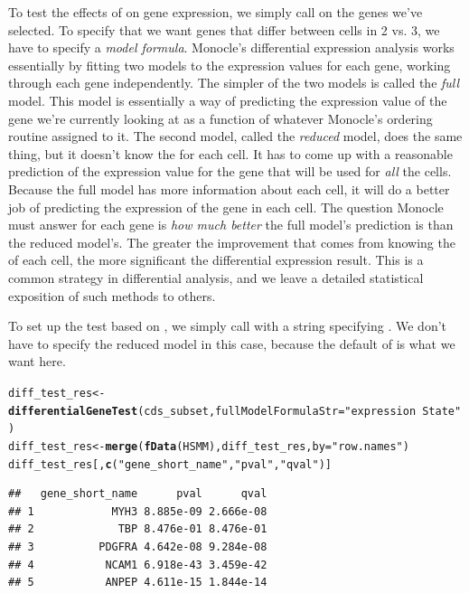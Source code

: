 \documentclass[10pt,oneside]{article}\usepackage[]{graphicx}\usepackage[]{color}
\makeatletter
\newcommand{\hlstr}[1]{\textcolor[rgb]{0.192,0.494,0.8}{#1}}%
\newcommand{\hlstd}[1]{\textcolor[rgb]{0.345,0.345,0.345}{#1}}%
\newcommand{\hlkwb}[1]{\textcolor[rgb]{0.69,0.353,0.396}{#1}}%
\newcommand{\hlkwc}[1]{\textcolor[rgb]{0.333,0.667,0.333}{#1}}%
\newcommand{\hlkwd}[1]{\textcolor[rgb]{0.737,0.353,0.396}{\textbf{#1}}}%
\newenvironment{kframe}{%
 \def\at@end@of@kframe{}%
 \ifinner\ifhmode%
  \def\at@end@of@kframe{\end{minipage}}%
  \begin{minipage}{\columnwidth}%
 \fi\fi%
 \def\FrameCommand##1{\hskip\@totalleftmargin \hskip-\fboxsep
 \colorbox{shadecolor}{##1}\hskip-\fboxsep
     \hskip-\linewidth \hskip-\@totalleftmargin \hskip\columnwidth}%
 \MakeFramed {\advance\hsize-\width
   \@totalleftmargin\z@ \linewidth\hsize
   \@setminipage}}%
 {\par\unskip\endMakeFramed%
 \at@end@of@kframe}
\newenvironment{knitrout}{}{} %
\makeatother
\begin{document}
To test the effects of  on gene expression, we simply call  on the genes we've selected.  To specify that we want genes that differ between cells in  2 vs.  3, we have to specify a \emph{model formula}. Monocle's differential expression analysis works essentially by fitting two models to the expression values for each gene, working through each gene independently.  The simpler of the two models is called the \emph{full} model.  This model is essentially a way of predicting the expression value of the gene we're currently looking at as a function of whatever  Monocle's ordering routine assigned to it.  The second model, called the \emph{reduced} model, does the same thing, but it doesn't know the  for each cell.  It has to come up with a reasonable prediction of the expression value for the gene that will be used for \emph{all} the cells. Because the full model has more information about each cell, it will do a better job of predicting the expression of the gene in each cell.  The question Monocle must answer for each gene is \emph{how much better} the full model's prediction is than the reduced model's. The greater the improvement that comes from knowing the  of each cell, the more significant the differential expression result. This is a common strategy in differential analysis, and we leave a detailed statistical exposition of such methods to others.

To set up the test based on , we simply call  with a string specifying .  We don't have to specify the reduced model in this case, because the default of  is what we want here.

\begin{knitrout}
\color{fgcolor}\begin{kframe}
\begin{alltt}
\hlstd{diff_test_res} \hlkwb{<-} \hlkwd{differentialGeneTest}\hlstd{(cds_subset,} \hlkwc{fullModelFormulaStr} \hlstd{=} \hlstr{"expression~State"}\hlstd{)}
\hlstd{diff_test_res} \hlkwb{<-} \hlkwd{merge}\hlstd{(}\hlkwd{fData}\hlstd{(HSMM), diff_test_res,} \hlkwc{by} \hlstd{=} \hlstr{"row.names"}\hlstd{)}
\hlstd{diff_test_res[,} \hlkwd{c}\hlstd{(}\hlstr{"gene_short_name"}\hlstd{,} \hlstr{"pval"}\hlstd{,} \hlstr{"qval"}\hlstd{)]}
\end{alltt}
\begin{verbatim}
##   gene_short_name      pval      qval
## 1            MYH3 8.885e-09 2.666e-08
## 2             TBP 8.476e-01 8.476e-01
## 3          PDGFRA 4.642e-08 9.284e-08
## 4           NCAM1 6.918e-43 3.459e-42
## 5           ANPEP 4.611e-15 1.844e-14
\end{verbatim}
\end{kframe}
\end{knitrout}
\end{document}
